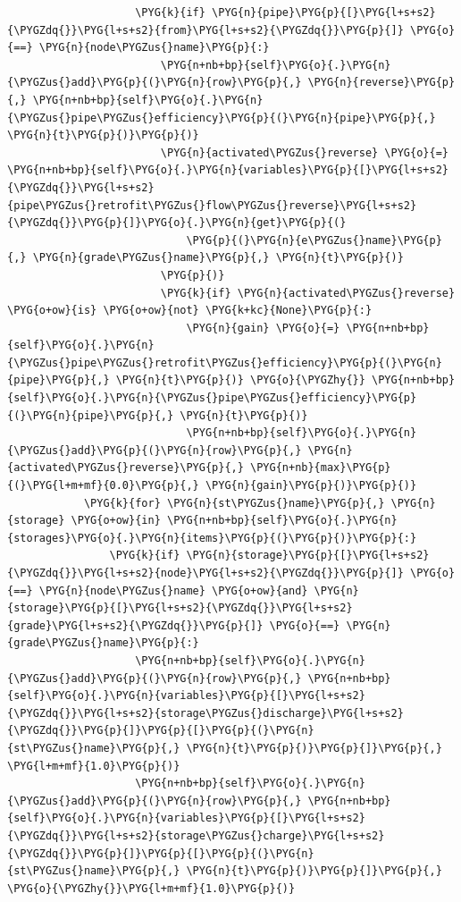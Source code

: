 \begin{Verbatim}
                    \PYG{k}{if} \PYG{n}{pipe}\PYG{p}{[}\PYG{l+s+s2}{\PYGZdq{}}\PYG{l+s+s2}{from}\PYG{l+s+s2}{\PYGZdq{}}\PYG{p}{]} \PYG{o}{==} \PYG{n}{node\PYGZus{}name}\PYG{p}{:}
                        \PYG{n+nb+bp}{self}\PYG{o}{.}\PYG{n}{\PYGZus{}add}\PYG{p}{(}\PYG{n}{row}\PYG{p}{,} \PYG{n}{reverse}\PYG{p}{,} \PYG{n+nb+bp}{self}\PYG{o}{.}\PYG{n}{\PYGZus{}pipe\PYGZus{}efficiency}\PYG{p}{(}\PYG{n}{pipe}\PYG{p}{,} \PYG{n}{t}\PYG{p}{)}\PYG{p}{)}
                        \PYG{n}{activated\PYGZus{}reverse} \PYG{o}{=} \PYG{n+nb+bp}{self}\PYG{o}{.}\PYG{n}{variables}\PYG{p}{[}\PYG{l+s+s2}{\PYGZdq{}}\PYG{l+s+s2}{pipe\PYGZus{}retrofit\PYGZus{}flow\PYGZus{}reverse}\PYG{l+s+s2}{\PYGZdq{}}\PYG{p}{]}\PYG{o}{.}\PYG{n}{get}\PYG{p}{(}
                            \PYG{p}{(}\PYG{n}{e\PYGZus{}name}\PYG{p}{,} \PYG{n}{grade\PYGZus{}name}\PYG{p}{,} \PYG{n}{t}\PYG{p}{)}
                        \PYG{p}{)}
                        \PYG{k}{if} \PYG{n}{activated\PYGZus{}reverse} \PYG{o+ow}{is} \PYG{o+ow}{not} \PYG{k+kc}{None}\PYG{p}{:}
                            \PYG{n}{gain} \PYG{o}{=} \PYG{n+nb+bp}{self}\PYG{o}{.}\PYG{n}{\PYGZus{}pipe\PYGZus{}retrofit\PYGZus{}efficiency}\PYG{p}{(}\PYG{n}{pipe}\PYG{p}{,} \PYG{n}{t}\PYG{p}{)} \PYG{o}{\PYGZhy{}} \PYG{n+nb+bp}{self}\PYG{o}{.}\PYG{n}{\PYGZus{}pipe\PYGZus{}efficiency}\PYG{p}{(}\PYG{n}{pipe}\PYG{p}{,} \PYG{n}{t}\PYG{p}{)}
                            \PYG{n+nb+bp}{self}\PYG{o}{.}\PYG{n}{\PYGZus{}add}\PYG{p}{(}\PYG{n}{row}\PYG{p}{,} \PYG{n}{activated\PYGZus{}reverse}\PYG{p}{,} \PYG{n+nb}{max}\PYG{p}{(}\PYG{l+m+mf}{0.0}\PYG{p}{,} \PYG{n}{gain}\PYG{p}{)}\PYG{p}{)}
            \PYG{k}{for} \PYG{n}{st\PYGZus{}name}\PYG{p}{,} \PYG{n}{storage} \PYG{o+ow}{in} \PYG{n+nb+bp}{self}\PYG{o}{.}\PYG{n}{storages}\PYG{o}{.}\PYG{n}{items}\PYG{p}{(}\PYG{p}{)}\PYG{p}{:}
                \PYG{k}{if} \PYG{n}{storage}\PYG{p}{[}\PYG{l+s+s2}{\PYGZdq{}}\PYG{l+s+s2}{node}\PYG{l+s+s2}{\PYGZdq{}}\PYG{p}{]} \PYG{o}{==} \PYG{n}{node\PYGZus{}name} \PYG{o+ow}{and} \PYG{n}{storage}\PYG{p}{[}\PYG{l+s+s2}{\PYGZdq{}}\PYG{l+s+s2}{grade}\PYG{l+s+s2}{\PYGZdq{}}\PYG{p}{]} \PYG{o}{==} \PYG{n}{grade\PYGZus{}name}\PYG{p}{:}
                    \PYG{n+nb+bp}{self}\PYG{o}{.}\PYG{n}{\PYGZus{}add}\PYG{p}{(}\PYG{n}{row}\PYG{p}{,} \PYG{n+nb+bp}{self}\PYG{o}{.}\PYG{n}{variables}\PYG{p}{[}\PYG{l+s+s2}{\PYGZdq{}}\PYG{l+s+s2}{storage\PYGZus{}discharge}\PYG{l+s+s2}{\PYGZdq{}}\PYG{p}{]}\PYG{p}{[}\PYG{p}{(}\PYG{n}{st\PYGZus{}name}\PYG{p}{,} \PYG{n}{t}\PYG{p}{)}\PYG{p}{]}\PYG{p}{,} \PYG{l+m+mf}{1.0}\PYG{p}{)}
                    \PYG{n+nb+bp}{self}\PYG{o}{.}\PYG{n}{\PYGZus{}add}\PYG{p}{(}\PYG{n}{row}\PYG{p}{,} \PYG{n+nb+bp}{self}\PYG{o}{.}\PYG{n}{variables}\PYG{p}{[}\PYG{l+s+s2}{\PYGZdq{}}\PYG{l+s+s2}{storage\PYGZus{}charge}\PYG{l+s+s2}{\PYGZdq{}}\PYG{p}{]}\PYG{p}{[}\PYG{p}{(}\PYG{n}{st\PYGZus{}name}\PYG{p}{,} \PYG{n}{t}\PYG{p}{)}\PYG{p}{]}\PYG{p}{,} \PYG{o}{\PYGZhy{}}\PYG{l+m+mf}{1.0}\PYG{p}{)}

\end{Verbatim}
